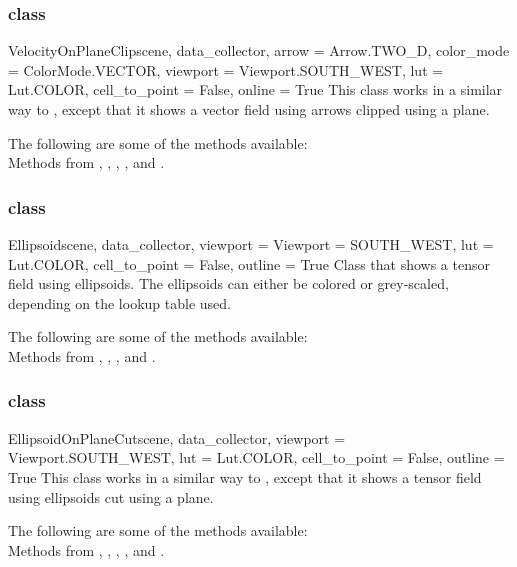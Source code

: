 \subsubsection{\VelocityOnPlaneClip class}

\begin{classdesc}{VelocityOnPlaneClip}{scene, data_collector, 
arrow = Arrow.TWO_D, color_mode = ColorMode.VECTOR, 
viewport = Viewport.SOUTH_WEST, lut = Lut.COLOR, 
cell_to_point = False, online = True}
This class works in a similar way to \MapOnPlaneClip, except that it shows a 
vector field using arrows clipped using a plane. 
\end{classdesc}

The following are some of the methods available:\\
Methods from \ActorThreeD, \GlyphThreeD, \Transform, \Clipper, 
\MaskPoints and \DataSetMapper. 

\subsubsection{\Ellipsoid class}

\begin{classdesc}{Ellipsoid}{scene, data_collector, 
viewport = Viewport = SOUTH_WEST, lut = Lut.COLOR, cell_to_point = False,
outline = True}
Class that shows a tensor field using ellipsoids. The ellipsoids can either be 
colored or grey-scaled, depending on the lookup table used. 
\end{classdesc}

The following are some of the methods available:\\
Methods from \ActorThreeD, \Sphere, \TensorGlyph, \MaskPoints and 
\DataSetMapper.

\subsubsection{\EllipsoidOnPlaneCut class}

\begin{classdesc}{EllipsoidOnPlaneCut}{scene, data_collector,
viewport = Viewport.SOUTH_WEST, lut = Lut.COLOR, cell_to_point = False,
outline = True}
This class works in a similar way to \MapOnPlaneCut, except that it shows
a tensor field using ellipsoids cut using a plane.
\end{classdesc}

The following are some of the methods available:\\
Methods from \ActorThreeD, \Sphere, \TensorGlyph, \Transform,
\MaskPoints and \DataSetMapper.

